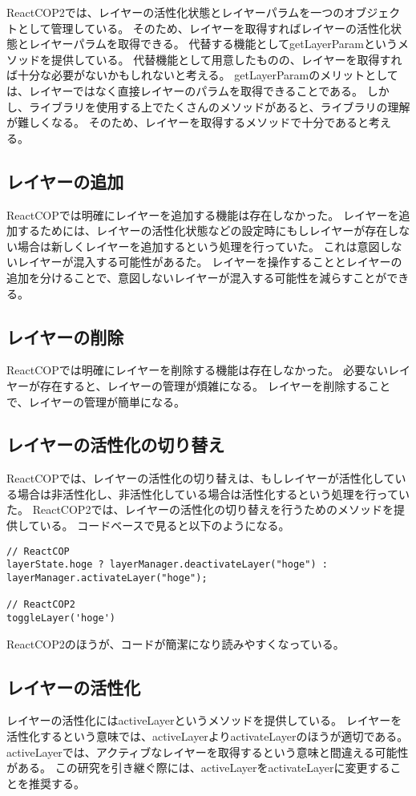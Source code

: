 \documentclass{jsarticle}
\begin{document}
ReactCOP2では、レイヤーの活性化状態とレイヤーパラムを一つのオブジェクトとして管理している。
そのため、レイヤーを取得すればレイヤーの活性化状態とレイヤーパラムを取得できる。
代替する機能としてgetLayerParamというメソッドを提供している。
代替機能として用意したものの、レイヤーを取得すれば十分な必要がないかもしれないと考える。
getLayerParamのメリットとしては、レイヤーではなく直接レイヤーのパラムを取得できることである。
しかし、ライブラリを使用する上でたくさんのメソッドがあると、ライブラリの理解が難しくなる。
そのため、レイヤーを取得するメソッドで十分であると考える。

\subsection{レイヤーの追加}
ReactCOPでは明確にレイヤーを追加する機能は存在しなかった。
レイヤーを追加するためには、レイヤーの活性化状態などの設定時にもしレイヤーが存在しない場合は新しくレイヤーを追加するという処理を行っていた。
これは意図しないレイヤーが混入する可能性があるた。
レイヤーを操作することとレイヤーの追加を分けることで、意図しないレイヤーが混入する可能性を減らすことができる。

\subsection{レイヤーの削除}
ReactCOPでは明確にレイヤーを削除する機能は存在しなかった。
必要ないレイヤーが存在すると、レイヤーの管理が煩雑になる。
レイヤーを削除することで、レイヤーの管理が簡単になる。

\subsection{レイヤーの活性化の切り替え}
ReactCOPでは、レイヤーの活性化の切り替えは、もしレイヤーが活性化している場合は非活性化し、非活性化している場合は活性化するという処理を行っていた。
ReactCOP2では、レイヤーの活性化の切り替えを行うためのメソッドを提供している。
コードベースで見ると以下のようになる。
\begin{lstlisting}[]
// ReactCOP
layerState.hoge ? layerManager.deactivateLayer("hoge") : layerManager.activateLayer("hoge");

// ReactCOP2
toggleLayer('hoge')
\end{lstlisting}
ReactCOP2のほうが、コードが簡潔になり読みやすくなっている。

\subsection{レイヤーの活性化}
レイヤーの活性化にはactiveLayerというメソッドを提供している。
レイヤーを活性化するという意味では、activeLayerよりactivateLayerのほうが適切である。
activeLayerでは、アクティブなレイヤーを取得するという意味と間違える可能性がある。
この研究を引き継ぐ際には、activeLayerをactivateLayerに変更することを推奨する。
\end{document}
